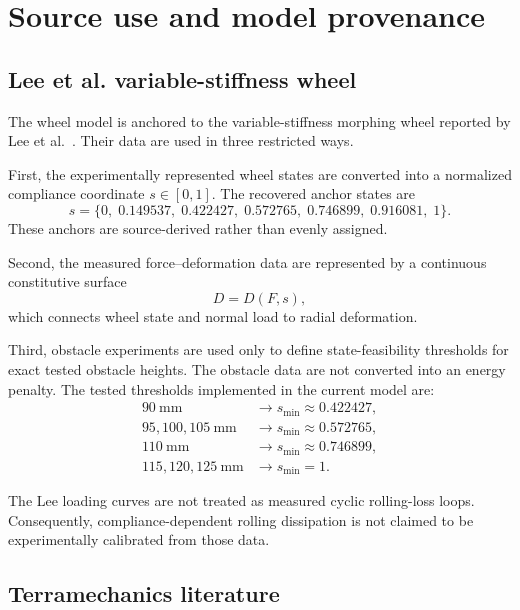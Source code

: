 \documentclass[11pt]{article}
\begin{document}
\section{Source use and model provenance}

\subsection{Lee et al. variable-stiffness wheel}

The wheel model is anchored to the variable-stiffness morphing wheel reported by Lee et al.\ \cite{Lee2024}. Their data are used in three restricted ways.

First, the experimentally represented wheel states are converted into a normalized compliance coordinate $s\in[0,1]$. The recovered anchor states are
\begin{equation}
s=\{0,\;0.149537,\;0.422427,\;0.572765,\;0.746899,\;0.916081,\;1\}.
\end{equation}
These anchors are source-derived rather than evenly assigned.

Second, the measured force--deformation data are represented by a continuous constitutive surface
\begin{equation}
D=D(F,s),
\end{equation}
which connects wheel state and normal load to radial deformation.

Third, obstacle experiments are used only to define state-feasibility thresholds for exact tested obstacle heights. The obstacle data are not converted into an energy penalty. The tested thresholds implemented in the current model are:
\begin{align}
90~\mathrm{mm}&\rightarrow s_{\min}\approx0.422427,\\
95,100,105~\mathrm{mm}&\rightarrow s_{\min}\approx0.572765,\\
110~\mathrm{mm}&\rightarrow s_{\min}\approx0.746899,\\
115,120,125~\mathrm{mm}&\rightarrow s_{\min}=1.
\end{align}

The Lee loading curves are not treated as measured cyclic rolling-loss loops. Consequently, compliance-dependent rolling dissipation is not claimed to be experimentally calibrated from those data.

\subsection{Terramechanics literature}
\end{document}
